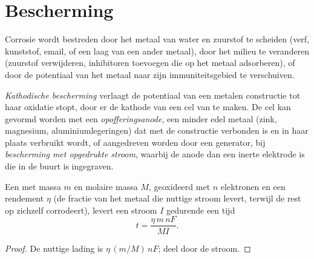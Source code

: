 \section{Bescherming}

Corrosie wordt bestreden door het metaal van water en zuurstof te scheiden (verf,
kunststof, email, of een laag van een ander metaal), door het milieu te veranderen
(zuurstof verwijderen, inhibitoren toevoegen die op het metaal adsorberen), of door de
potentiaal van het metaal naar zijn immuniteitsgebied te verschuiven.

\begin{definition}\label{def:b2:corrosion:protection}
\emph{Kathodische bescherming} verlaagt de potentiaal van een
metalen constructie tot haar oxidatie stopt, door er de kathode van een cel van te maken.
De cel kan gevormd worden met een \emph{opofferingsanode},
een minder edel metaal (zink, magnesium, aluminiumlegeringen) dat met de
constructie verbonden is en in haar plaats verbruikt wordt, of aangedreven worden door een generator, bij
\emph{bescherming met opgedrukte stroom}, waarbij de
anode dan een inerte elektrode is die in de buurt is ingegraven.
\end{definition}

\begin{proposition}\label{prop:b2:corrosion:anode-life}
Een  met massa $m$ en molaire massa $M$, geoxideerd met $n$ elektronen
en een rendement $\eta$ (de fractie van het metaal die nuttige
stroom levert, terwijl de rest op zichzelf corrodeert), levert een stroom $I$ gedurende een tijd
\[
  t = \frac{\eta\,m\,nF}{M I} .
\]
\end{proposition}

\begin{proof}
De nuttige lading is $\eta\,(m/M)\,nF$; deel door de stroom.
\end{proof}

